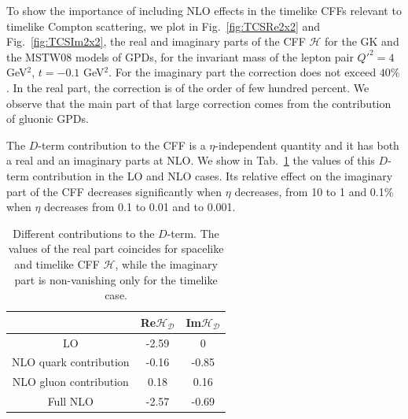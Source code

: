 To show the importance of including NLO effects in the timelike CFFs relevant
to timelike Compton scattering, we plot in Fig.~\ref{fig:TCSRe2x2} and
Fig.~\ref{fig:TCSIm2x2}, the real and imaginary parts of the CFF $\mathcal{H}$
for the GK and the MSTW08 models of GPDs, for the invariant mass of the lepton
pair $Q'^2=4$ GeV$^2$, $t=-0.1$ GeV$^2$. For the imaginary part the correction
does not exceed $40\%$. In the real part, the correction is of the order of
few hundred percent. We observe that the main part of that large correction
comes from the contribution of gluonic GPDs. 



The $D$-term contribution to the CFF is a $\eta$-independent quantity and it
has both a real and an imaginary parts at NLO. 
We show in Tab.~\ref{tableDTCS} the values of this $D$-term contribution in
the LO and NLO cases. Its relative effect on the imaginary part of the CFF
decreases significantly when $\eta$ decreases, from 10 to 1 and 0.1\% when
$\eta$ decreases from 0.1 to 0.01 and to 0.001.
\begin{table}[h]
\begin{center}
\begin{tabular}{|c||c|c|}
\hline
 & Re$\mathcal{H_D}$ &  Im$\mathcal{H_D}$ \\ \hline \hline
LO &  -2.59 & 0 \\ \hline
NLO quark contribution & -0.16 & -0.85 \\ \hline
NLO gluon contribution & 0.18 & 0.16 \\ \hline
Full NLO & -2.57 & -0.69 \\ 
\hline
\end{tabular}
\caption{\small Different contributions to the $D$-term. The values of the
real part coincides for spacelike and timelike CFF $\mathcal{H}$, while the
imaginary part is non-vanishing only for the timelike case.}
\label{tableDTCS}
\end{center}
\end{table}

